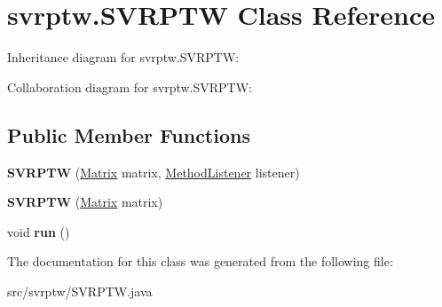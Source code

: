 \hypertarget{classsvrptw_1_1_s_v_r_p_t_w}{}\section{svrptw.\+S\+V\+R\+P\+TW Class Reference}
\label{classsvrptw_1_1_s_v_r_p_t_w}


Inheritance diagram for svrptw.\+S\+V\+R\+P\+TW\+:


Collaboration diagram for svrptw.\+S\+V\+R\+P\+TW\+:
\subsection*{Public Member Functions}
\begin{DoxyCompactItemize}
\item 
{\bfseries S\+V\+R\+P\+TW} (\hyperlink{classheneticmethod_1_1_matrix}{Matrix} matrix, \hyperlink{interfacesvrptw_1_1_method_listener}{Method\+Listener} listener)\hypertarget{classsvrptw_1_1_s_v_r_p_t_w_aa35377acd5bd1514f2c6feb9d9189776}{}\label{classsvrptw_1_1_s_v_r_p_t_w_aa35377acd5bd1514f2c6feb9d9189776}

\item 
{\bfseries S\+V\+R\+P\+TW} (\hyperlink{classheneticmethod_1_1_matrix}{Matrix} matrix)\hypertarget{classsvrptw_1_1_s_v_r_p_t_w_ae61e9c602f9c12e11dd5e92720e1e74b}{}\label{classsvrptw_1_1_s_v_r_p_t_w_ae61e9c602f9c12e11dd5e92720e1e74b}

\item 
void {\bfseries run} ()\hypertarget{classsvrptw_1_1_s_v_r_p_t_w_a5fe7ed12c707f69197b681ab1398f57a}{}\label{classsvrptw_1_1_s_v_r_p_t_w_a5fe7ed12c707f69197b681ab1398f57a}

\end{DoxyCompactItemize}


The documentation for this class was generated from the following file\+:\begin{DoxyCompactItemize}
\item 
src/svrptw/S\+V\+R\+P\+T\+W.\+java\end{DoxyCompactItemize}

